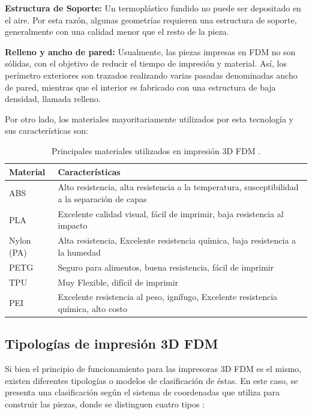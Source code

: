 \begin{description}
\item \textbf{Estructura de Soporte:} Un termoplástico fundido no puede ser depositado en el aire. Por esta razón, algunas geometrías requieren una estructura de soporte, generalmente con una calidad menor que el resto de la pieza.
\end{description}

\begin{description}
\item \textbf{Relleno y ancho de pared:} Usualmente, las piezas impresas en FDM no son sólidas, con el objetivo de reducir el tiempo de impresión y material. Así, los perímetro exteriores son trazados realizando varias pasadas denominadas ancho de pared, mientras que el interior es fabricado con una estructura de baja densidad, llamada relleno.
\end{description}

Por otro lado, los materiales mayoritariamente utilizados por esta tecnología y sus características son: 

\begin{table}[H]
\centering
\begin{tabular}{|p{2cm}|p{8cm}|}
\hline
Material & Características \\
\hline
ABS & Alto resistencia, alta resistencia a la temperatura, susceptibilidad a la separación de capas\\
\hline
PLA & Excelente calidad visual, fácil de imprimir, baja resistencia al impacto\\
\hline
Nylon (PA) & Alta resistencia, Excelente resistencia química, baja resistencia a la humedad\\
\hline
PETG & Seguro para alimentos, buena resistencia, fácil de imprimir\\
\hline
TPU & Muy Flexible, difícil de imprimir\\
\hline
PEI & Excelente resistencia al peso, ignífugo, Excelente resistencia química, alto costo\\
\hline
\end{tabular}
\caption{Principales materiales utilizados en impresión 3D FDM \citep{bournias2017}.}
\end{table}

\subsection{Tipologías de impresión 3D FDM}

Si bien el principio de funcionamiento para las impresoras 3D FDM es el mismo, existen diferentes tipologías o modelos de clasificación de éstas. En este caso, se presenta una clasificación según el sistema de coordenadas que utiliza para construir las piezas, donde se distinguen cuatro tipos \citep{b3dsourced2020}:

